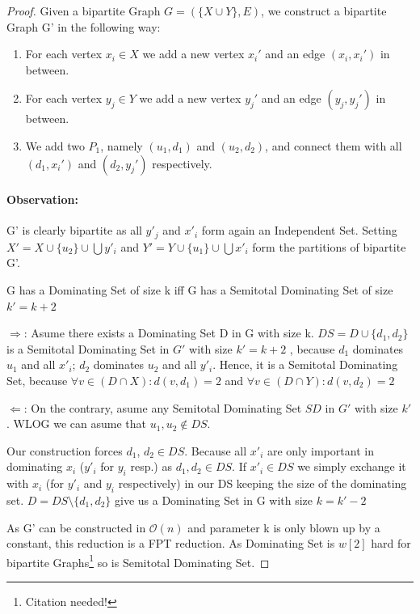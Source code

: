 \begin{proof}
    Given a bipartite Graph $G = ( \{X \cup Y\}, E)$, we construct a bipartite Graph G' in the following way:
    \begin{enumerate}
        \item For each vertex $x_i \in X$ we add a new vertex $x_i'$  and an edge $(x_i, x_i')$ in between.
        \item For each vertex $y_j \in Y$ we add a new vertex $y_j'$ and an edge $(y_j, y_j')$ in between.
        \item We add two $P_1$, namely $(u_1, d_1)$ and $(u_2, d_2)$, and connect them with all $(d_1, x_i')$ and $(d_2, y_j')$ respectively.
    \end{enumerate}
    \paragraph*{Observation:} G' is clearly bipartite as all $y'_j$ and $x'_i$ form again an Independent Set. Setting  $X' = X \cup \{u_2\} \cup \bigcup y'_i$ and $Y' = Y \cup \{u_1\} \cup \bigcup {x'_i}$ form the partitions of bipartite G'.

    \begin{corollary} G has a Dominating Set of size k iff G has a Semitotal Dominating Set of size $k' = k + 2$
    \end{corollary} 
    $\Rightarrow$: Asume there exists a Dominating Set D in G with size k. $DS = D\cup \{d_1,d_2\}$ is a Semitotal Dominating Set in $G'$ with size $k' = k+2 $ , because $d_1$ dominates $u_1$ and all $x'_i$; $d_2$ dominates $u_2$ and all $y'_i$. Hence, it is a Semitotal Dominating Set, because $\forall v \in (D \cap X): d(v, d_1) = 2$ and $\forall v \in (D \cap Y): d(v, d_2) = 2$

    $\Leftarrow$: On the contrary, asume any Semitotal Dominating Set $SD$ in $G'$ with size $k'$. WLOG we can asume that $u_1, u_2 \notin DS$. 
    
    Our construction forces $d_1$, $d_2 \in DS$. Because all $x'_i$ are only important in dominating $x_i$ ($y'_i$ for $y_i$ resp.) as $d_1, d_2 \in DS$. If $x'_i \in DS$ we simply exchange it with $x_i$ (for $y'_i$ and $y_i$ respectively) in our DS keeping the size of the dominating set. $D = DS \setminus \{ d_1,d_2\}$ give us a Dominating Set in G with size $ k = k' - 2$

    As G' can be constructed in $\mathcal{O}(n)$ and parameter k is only blown up by a constant, this reduction is a FPT reduction. As Dominating Set is $w[2]$ hard for bipartite Graphs\footnote{Citation needed!} so is Semitotal Dominating Set.
\end{proof}

